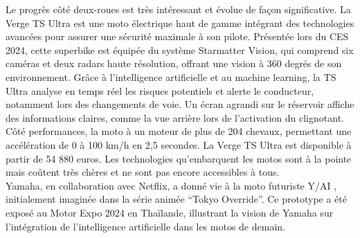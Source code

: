 Le progrès côté deux-roues est très intéressant et évolue de façon significative.
La Verge TS Ultra est une moto électrique \cite{lenoir_cette_2024} haut de gamme intégrant des technologies avancées pour assurer une sécurité maximale à son pilote. Présentée lors du CES 2024, cette superbike est équipée du système Starmatter Vision, qui comprend six caméras et deux radars haute résolution, offrant une vision à 360 degrés de son environnement. Grâce à l’intelligence artificielle et au machine learning, la TS Ultra analyse en temps réel les risques potentiels et alerte le conducteur, notamment lors des changements de voie. Un écran agrandi sur le réservoir affiche des informations claires, comme la vue arrière lors de l’activation du clignotant. Côté performances, la moto à un moteur de plus de 204 chevaux, permettant une accélération de 0 à 100 km/h en 2,5 secondes. La Verge TS Ultra est disponible à partir de 54 880 euros.
Les technologies qu'embarquent les motos sont à la pointe mais coûtent très chères et ne sont pas encore accessibles à tous.\\
Yamaha, en collaboration avec Netflix, a donné vie à la moto futuriste Y/AI \cite{texier_quand_2024} , initialement imaginée dans la série animée “Tokyo Override”. Ce prototype a été exposé au Motor Expo 2024 en Thaïlande, illustrant la vision de Yamaha sur l’intégration de l’intelligence artificielle dans les motos de demain.\\

